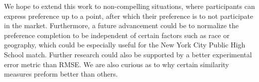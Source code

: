 We hope to extend this work to non-compelling situations, where participants can express preference up to a point, after which their preference is to not participate in the market. Furthermore, a future advancement could be to normalize the preference completion to be independent of certain factors such as race or geography, which could be especially useful for the New York City Public High School match. Further research could also be supported by a better experimental error metric than RMSE. We are also curious as to why certain similarity measures preform better than others.